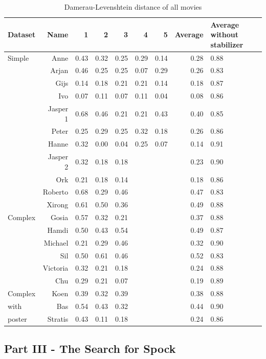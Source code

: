 \begin{table}
\centering
\begin{tabular}{p{0.4in}rrrrrrrp{0.55in}}
\hline
Dataset & Name	& 1 & 2 & 3 & 4 & 5 & Average & Average without stabilizer\\
\hline
Simple & Anne	&	0.43	&	0.32	&	0.25	&	0.29	&	0.14	&	0.28	&	0.88 \\
 & Arjan	&	0.46	&	0.25	&	0.25	&	0.07	&	0.29	&	0.26	&	0.83 \\
 & Gijs	&	0.14	&	0.18	&	0.21	&	0.21	&	0.14	&	0.18	&	0.87 \\
 & Ivo	&	0.07	&	0.11	&	0.07	&	0.11	&	0.04	&	0.08	&	0.86 \\
 & Jasper 1	&	0.68	&	0.46	&	0.21	&	0.21	&	0.43	&	0.40	&	0.85 \\
 & Peter	&	0.25	&	0.29	&	0.25	&	0.32	&	0.18	&	0.26	&	0.86 \\
 & Hanne	&	0.32	&	0.00	&	0.04	&	0.25	&	0.07	&	0.14	&	0.91 \\
 & Jasper 2	&	0.32	&	0.18	&	0.18	&	 	&	 	&	0.23	&	0.90 \\
 & Ork	&	0.21	&	0.18	&	0.14	&	 	&	 	&	0.18	&	0.86 \\
 & Roberto	&	0.68	&	0.29	&	0.46	&	 	&	 	&	0.47	&	0.83 \\
 & Xirong	&	0.61	&	0.50	&	0.36	&	 	&	 	&	0.49	&	0.88 \\
\hline
Complex & Gosia	&	0.57	&	0.32	&	0.21	&	 	&	 	&	0.37	&	0.88 \\
 & Hamdi	&	0.50	&	0.43	&	0.54	&	 	&	 	&	0.49	&	0.87 \\
 & Michael	&	0.21	&	0.29	&	0.46	&	 	&	 	&	0.32	&	0.90 \\
 & Sil	&	0.50	&	0.61	&	0.46	&	 	&	 	&	0.52	&	0.83 \\
 & Victoria	&	0.32	&	0.21	&	0.18	&	 	&	 	&	0.24	&	0.88 \\
 & Chu	&	0.29	&	0.21	&	0.07	&	 	&	 	&	0.19	&	0.89 \\
\hline
Complex & Koen	&	0.39	&	0.32	&	0.39	&	 	&	 	&	0.38	&	0.88\\
with & Bas	&	0.54	&	0.43	&	0.32	&	 	&	 	&	0.44	&	0.90 \\
poster & Stratis	&	0.43	&	0.11	&	0.18	&	 	&	 	&	0.24	&	0.86 \\


\hline
\end{tabular}
\caption{Damerau-Levenshtein distance of all movies}
\label{tab:distance}
\end{table}



\subsection{Part III - The Search for Spock}

